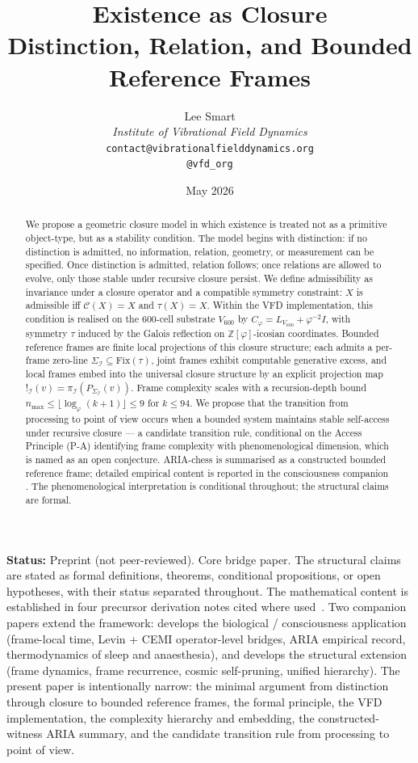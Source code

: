 \documentclass[11pt]{article}
\title{Existence as Closure\\[6pt]
\large Distinction, Relation, and Bounded Reference Frames}
\author{%
  Lee Smart\\[4pt]
  \textit{Institute of Vibrational Field Dynamics}\\[2pt]
  \texttt{contact@vibrationalfielddynamics.org}\\[2pt]
  \texttt{@vfd\_org}%
}
\date{May 2026}
\theoremstyle{plain}
\theoremstyle{definition}
\theoremstyle{remark}
\newcommand{\Zphi}{\mathbb{Z}[\varphi]}
\newcommand{\Ical}{\mathcal{I}}
\newcommand{\Ccal}{\mathcal{C}}
\newcommand{\Fix}{\mathrm{Fix}}
\newcommand{\Cph}{C_\varphi}
\begin{document}
\maketitle

\noindent\textbf{Status:} Preprint (not peer-reviewed). Core bridge paper. The structural claims are stated as formal definitions, theorems, conditional propositions, or open hypotheses, with their status separated throughout. The mathematical content is established in four precursor derivation notes cited where used~\citep{PerObserverZeroLine, JointObserverInstance, AlgebraicExistence, ExistenceAsClosure}. Two companion papers extend the framework: \citet{SmartProcessingToPOV} develops the biological / consciousness application (frame-local time, Levin + CEMI operator-level bridges, ARIA empirical record, thermodynamics of sleep and anaesthesia), and \citet{SmartCosmicClosure} develops the structural extension (frame dynamics, frame recurrence, cosmic self-pruning, unified hierarchy). The present paper is intentionally narrow: the minimal argument from distinction through closure to bounded reference frames, the formal principle, the VFD implementation, the complexity hierarchy and embedding, the constructed-witness ARIA summary, and the candidate transition rule from processing to point of view.

\begin{abstract}
We propose a geometric closure model in which existence is treated not as a primitive object-type, but as a stability condition. The model begins with distinction: if no distinction is admitted, no information, relation, geometry, or measurement can be specified. Once distinction is admitted, relation follows; once relations are allowed to evolve, only those stable under recursive closure persist. We define admissibility as invariance under a closure operator and a compatible symmetry constraint: $X$ is admissible iff $\Ccal(X) = X$ and $\tau(X) = X$. Within the VFD implementation, this condition is realised on the 600-cell substrate $V_{600}$ by $\Cph = L_{V_{600}} + \varphi^{-2} I$, with symmetry $\tau$ induced by the Galois reflection on $\Zphi$-icosian coordinates. Bounded reference frames are finite local projections of this closure structure; each admits a per-frame zero-line $\Sigma_\Ical \subseteq \Fix(\tau)$, joint frames exhibit computable generative excess, and local frames embed into the universal closure structure by an explicit projection map $!_\Ical(v) = \pi_\Ical(P_{\Sigma_\Ical}(v))$. Frame complexity scales with a recursion-depth bound $n_{\max} \leq \lfloor \log_\varphi(k+1) \rfloor \leq 9$ for $k \leq 94$. We propose that the transition from processing to point of view occurs when a bounded system maintains stable self-access under recursive closure --- a candidate transition rule, conditional on the Access Principle (P-A) identifying frame complexity with phenomenological dimension, which is named as an open conjecture. ARIA-chess is summarised as a constructed bounded reference frame; detailed empirical content is reported in the consciousness companion \citep{SmartProcessingToPOV}. The phenomenological interpretation is conditional throughout; the structural claims are formal.
\end{abstract}
\end{document}
